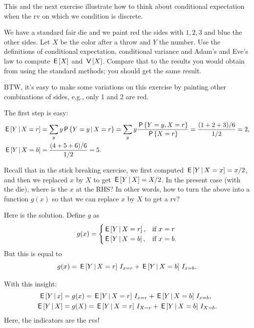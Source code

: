 \documentclass[lectures]{subfiles}
\begin{document}
This and the next exercise illustrate how to think about conditional expectation when the rv on which we condition is discrete.

\begin{exercise}
We have a standard fair die and we paint red the sides with $1, 2, 3$ and blue the other sides.
Let $X$ be the color after a throw and $Y$ the number.
Use the definitions of conditional expectation, conditional variance and Adam's and Eve's law to compute $\,\mathsf{E}\left[X\right]$ and $\,\mathsf{V}\left[X\right]$.
Compare that to the results you would obtain from using the standard methods; you should get the same result.

BTW, it's easy to make some variations on this exercise by painting other combinations of sides, e.g., only 1 and 2 are red.
\begin{solution}
The first step is easy:
\begin{align}
\,\mathsf{E}\left[Y\,\middle|\, X=r\right] &= \sum_{y} y \,\mathsf{P}\left\{Y=y\,\middle|\, X=r\right\} = \sum_{y} y \frac{\,\mathsf{P}\left\{Y=y,  X=r\right\}}{\,\mathsf{P}\left\{X=r\right\}} = \frac{(1+2+3)/6}{1/2}  = 2, \\
\,\mathsf{E}\left[Y\,\middle|\, X=b\right] &= \frac{(4 + 5+ 6)/6}{1/2}  = 5.
\end{align}

Recall that in the stick breaking exercise, we first computed $\,\mathsf{E}\left[Y\,\middle|\, X = x\right] = x/2$, and then we replaced $x$ by $X$ to get $\,\mathsf{E}\left[Y\,\middle|\, X\right] = X/2$. In the present case (with the die), where is the $x$ at the RHS? In other words, how to turn the above into a function $g(x)$ so that we can replace $x$ by $X$ to get a rv?


Here is the solution. Define $g$ as
\begin{equation}
  \label{eq:1}
  g(x) =
  \begin{cases}
    \,\mathsf{E}\left[Y\,\middle|\, X=r\right], & \text{if } x = r \\
    \,\mathsf{E}\left[Y\,\middle|\, X=b\right], & \text{if } x = b.
  \end{cases}
\end{equation}
But this is equal to
\begin{equation}
  \label{eq:2}
  g(x) = \,\mathsf{E}\left[Y\,\middle|\, X=r\right] \,I_{x=r} + \,\mathsf{E}\left[Y\,\middle|\, X=b\right] \,I_{x=b}.
\end{equation}

With this insight:
\begin{align*}
\,\mathsf{E}\left[Y\,\middle|\, x\right] &=  g(x) = \,\mathsf{E}\left[Y\,\middle|\, X=r\right] \,I_{x=r} + \,\mathsf{E}\left[Y\,\middle|\, X=b\right] \,I_{x=b}, \\
\,\mathsf{E}\left[Y\,\middle|\, X\right] &=  g(X) = \,\mathsf{E}\left[Y\,\middle|\, X=r\right] \,I_{X=r} + \,\mathsf{E}\left[Y\,\middle|\, X=b\right] \,I_{X=b}.
\end{align*}
Here, the indicators are the rvs!


\end{solution}
\end{exercise}
\end{document}
